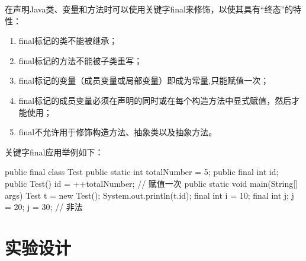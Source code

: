 在声明Java类、变量和方法时可以使用关键字final来修饰，以使其具有“终态”的特性：

\begin{enumerate}\kai
\item final标记的类不能被继承；
\item final标记的方法不能被子类重写；
\item final标记的变量（成员变量或局部变量）即成为常量,只能赋值一次；
\item final标记的成员变量必须在声明的同时或在每个构造方法中显式赋值，然后才能使用；
\item final不允许用于修饰构造方法、抽象类以及抽象方法。
\end{enumerate}

关键字final应用举例如下：

\begin{javaCode}
public final class Test {
  public static int totalNumber = 5;
  public final int id;
  public Test() {
    id = ++totalNumber; // 赋值一次
  }
  public static void main(String[] args) {
    Test t = new Test();
    System.out.println(t.id);
    final int i = 10;
    final int j;
    j = 20;
    j = 30;  // 非法
  }
}
\end{javaCode}

\newpage
\section*{实验设计}
\sline
